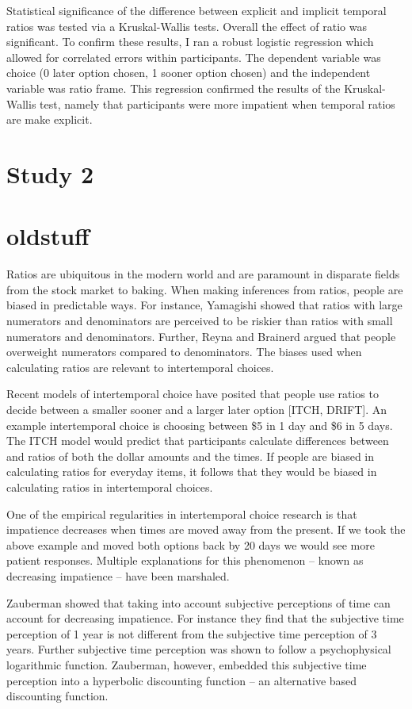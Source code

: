 \documentclass[]{article}
\begin{document}
Statistical significance of  the difference between explicit and implicit temporal ratios was tested via a Kruskal-Wallis tests.
 Overall the effect of ratio was significant. 
 To confirm these results, I ran a robust logistic regression which allowed for correlated errors within participants.
 The dependent variable was choice (0 later option chosen, 1 sooner option chosen) and the independent variable was ratio frame. 
 This regression confirmed the results of the Kruskal-Wallis test, namely that participants were more impatient when temporal ratios are make explicit. 
 

\section{Study 2}


\section{oldstuff}


Ratios are ubiquitous in the modern world and are paramount in disparate fields from the stock market to baking. 
When making inferences from ratios, people are biased in predictable ways.
For instance, Yamagishi showed that ratios with large numerators and denominators are perceived to be riskier than ratios with small numerators and denominators. Further, Reyna and Brainerd argued that people overweight numerators compared to denominators.
The biases used when calculating ratios are relevant to intertemporal choices. 

Recent models of intertemporal choice have posited that people use ratios to decide between a smaller sooner and a larger later option [ITCH, DRIFT]. 
An example intertemporal choice is choosing between \$5 in 1 day and \$6 in 5 days. 
The ITCH model would predict that participants calculate differences between and ratios of both the dollar amounts and the times. 
If people are biased in calculating ratios for everyday items, it follows that they would be biased in calculating ratios in intertemporal choices. 

One of the empirical regularities in intertemporal choice research is that impatience decreases when times are moved away from the present.
If we took the above example and moved both options back by 20 days we would see more patient responses. 
Multiple explanations for this phenomenon -- known as decreasing impatience -- have been marshaled. 

Zauberman showed that taking into account subjective perceptions of time can account for decreasing impatience. 
For instance they find that the subjective time perception of 1 year is not different from the subjective time perception of 3 years. 
Further subjective time perception was shown to follow a psychophysical logarithmic function. Zauberman, however, embedded this subjective time perception into a hyperbolic discounting function – an alternative based discounting function.  
\end{document}
